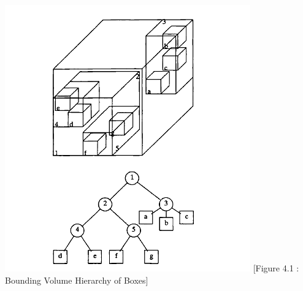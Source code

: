 \documentclass{article}
\begin{document}
\begin{multicols}{2}
\centering
\includegraphics[width=\linewidth]{BVH}
[Figure 4.1 : Bounding Volume Hierarchy of Boxes]

\end{multicols}

\newpage
\end{document}
